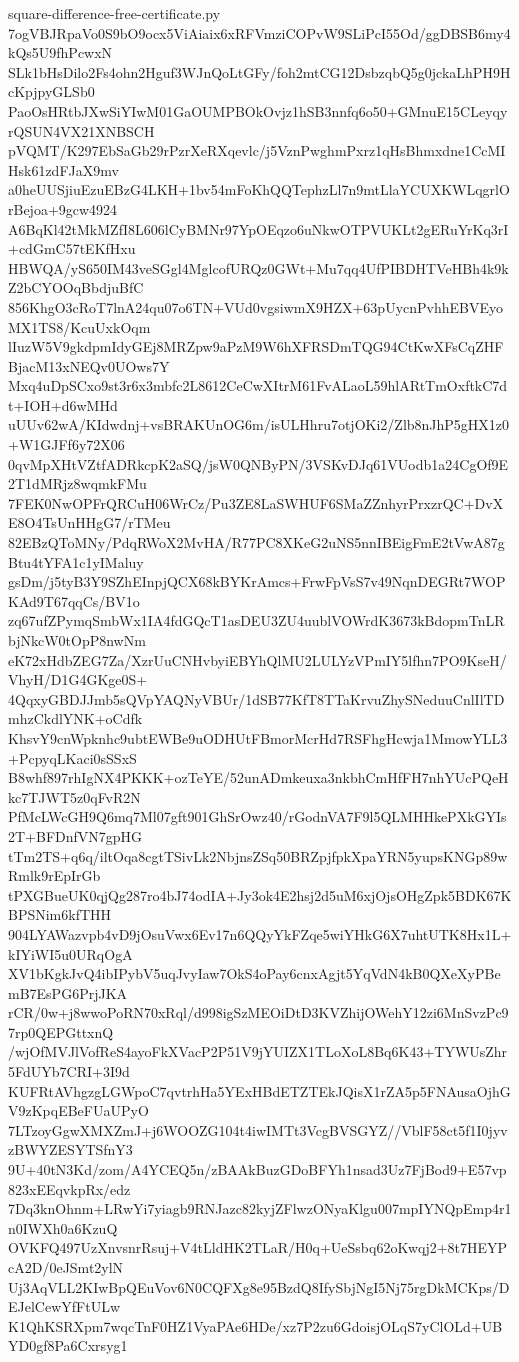 \documentclass[11pt]{article}
\theoremstyle{definition}
\theoremstyle{remark}
\begin{document}
\begin{filecontents*}[overwrite]{square-difference-free-certificate.py}
7ogVBJRpaVo0S9bO9ocx5ViAiaix6xRFVmziCOPvW9SLiPcI55Od/ggDBSB6my4kQs5U9fhPcwxN
SLk1bHsDilo2Fs4ohn2Hguf3WJnQoLtGFy/foh2mtCG12DsbzqbQ5g0jckaLhPH9HcKpjpyGLSb0
PaoOsHRtbJXwSiYIwM01GaOUMPBOkOvjz1hSB3nnfq6o50+GMnuE15CLeyqyrQSUN4VX21XNBSCH
pVQMT/K297EbSaGb29rPzrXeRXqevlc/j5VznPwghmPxrz1qHsBhmxdne1CcMIHsk61zdFJaX9mv
a0heUUSjiuEzuEBzG4LKH+1bv54mFoKhQQTephzLl7n9mtLlaYCUXKWLqgrlOrBejoa+9gcw4924
A6BqKl42tMkMZfI8L606lCyBMNr97YpOEqzo6uNkwOTPVUKLt2gERuYrKq3rI+cdGmC57tEKfHxu
HBWQA/yS650IM43veSGgl4MglcofURQz0GWt+Mu7qq4UfPIBDHTVeHBh4k9kZ2bCYOOqBbdjuBfC
856KhgO3cRoT7lnA24qu07o6TN+VUd0vgsiwmX9HZX+63pUycnPvhhEBVEyoMX1TS8/KcuUxkOqm
lIuzW5V9gkdpmIdyGEj8MRZpw9aPzM9W6hXFRSDmTQG94CtKwXFsCqZHFBjacM13xNEQv0UOws7Y
Mxq4uDpSCxo9st3r6x3mbfc2L8612CeCwXItrM61FvALaoL59hlARtTmOxftkC7dt+IOH+d6wMHd
uUUv62wA/KIdwdnj+vsBRAKUnOG6m/isULHhru7otjOKi2/Zlb8nJhP5gHX1z0+W1GJFf6y72X06
0qvMpXHtVZtfADRkcpK2aSQ/jsW0QNByPN/3VSKvDJq61VUodb1a24CgOf9E2T1dMRjz8wqmkFMu
7FEK0NwOPFrQRCuH06WrCz/Pu3ZE8LaSWHUF6SMaZZnhyrPrxzrQC+DvXE8O4TsUnHHgG7/rTMeu
82EBzQToMNy/PdqRWoX2MvHA/R77PC8XKeG2uNS5nnIBEigFmE2tVwA87gBtu4tYFA1c1yIMaluy
gsDm/j5tyB3Y9SZhEInpjQCX68kBYKrAmcs+FrwFpVsS7v49NqnDEGRt7WOPKAd9T67qqCs/BV1o
zq67ufZPymqSmbWx1IA4fdGQcT1asDEU3ZU4uublVOWrdK3673kBdopmTnLRbjNkcW0tOpP8nwNm
eK72xHdbZEG7Za/XzrUuCNHvbyiEBYhQlMU2LULYzVPmIY5lfhn7PO9KseH/VhyH/D1G4GKge0S+
4QqxyGBDJJmb5sQVpYAQNyVBUr/1dSB77KfT8TTaKrvuZhySNeduuCnlIlTDmhzCkdlYNK+oCdfk
KhsvY9cnWpknhc9ubtEWBe9uODHUtFBmorMcrHd7RSFhgHcwja1MmowYLL3+PcpyqLKaci0sSSxS
B8whf897rhIgNX4PKKK+ozTeYE/52unADmkeuxa3nkbhCmHfFH7nhYUcPQeHkc7TJWT5z0qFvR2N
PfMcLWcGH9Q6mq7Ml07gft901GhSrOwz40/rGodnVA7F9l5QLMHHkePXkGYIs2T+BFDnfVN7gpHG
tTm2TS+q6q/iltOqa8cgtTSivLk2NbjnsZSq50BRZpjfpkXpaYRN5yupsKNGp89wRmlk9rEpIrGb
tPXGBueUK0qjQg287ro4bJ74odIA+Jy3ok4E2hsj2d5uM6xjOjsOHgZpk5BDK67KBPSNim6kfTHH
904LYAWazvpb4vD9jOsuVwx6Ev17n6QQyYkFZqe5wiYHkG6X7uhtUTK8Hx1L+kIYiWI5u0URqOgA
XV1bKgkJvQ4ibIPybV5uqJvyIaw7OkS4oPay6cnxAgjt5YqVdN4kB0QXeXyPBemB7EsPG6PrjJKA
rCR/0w+j8wwoPoRN70xRql/d998igSzMEOiDtD3KVZhijOWehY12zi6MnSvzPc97rp0QEPGttxnQ
/wjOfMVJlVofReS4ayoFkXVacP2P51V9jYUIZX1TLoXoL8Bq6K43+TYWUsZhr5FdUYb7CRI+3I9d
KUFRtAVhgzgLGWpoC7qvtrhHa5YExHBdETZTEkJQisX1rZA5p5FNAusaOjhGV9zKpqEBeFUaUPyO
7LTzoyGgwXMXZmJ+j6WOOZG104t4iwIMTt3VcgBVSGYZ//VblF58ct5f1I0jyvzBWYZESYTSfnY3
9U+40tN3Kd/zom/A4YCEQ5n/zBAAkBuzGDoBFYh1nsad3Uz7FjBod9+E57vp823xEEqvkpRx/edz
7Dq3knOhnm+LRwYi7yiagb9RNJazc82kyjZFlwzONyaKlgu007mpIYNQpEmp4r1n0IWXh0a6KzuQ
OVKFQ497UzXnvsnrRsuj+V4tLldHK2TLaR/H0q+UeSsbq62oKwqj2+8t7HEYPcA2D/0eJSmt2ylN
Uj3AqVLL2KIwBpQEuVov6N0CQFXg8e95BzdQ8IfySbjNgI5Nj75rgDkMCKps/DEJelCewYfFtULw
K1QhKSRXpm7wqcTnF0HZ1VyaPAe6HDe/xz7P2zu6GdoisjOLqS7yClOLd+UBYD0gf8Pa6Cxrsyg1

\end{filecontents*}
\end{document}
